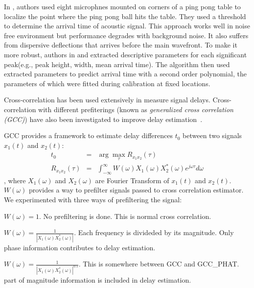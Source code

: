 In \cite{tdoa:ppp}, authors used eight microphnes mounted on corners of a ping pong table to localize the point where the ping pong ball hits the table. They used a threshold to determine the arrival time of acoustic signal. This approach works well in noise free environment but performance degrades with background noise. It also suffers from dispersive deflections that arrives before the main wavefront. To make it more robust, authors in \cite{tdoa:mit3} and \cite{tdoa:mit4} extracted descriptive parameters for each significant peak(e.g., peak height, width, mean arrival time). The algorithm then used extracted parameters to predict arrival time with a second order polynomial, the parameters of which were fitted during calibration at fixed locations.

Cross-correlation has been used extensively in measure signal delays\cite{tdoa:mit2, tdoa:3}. Cross-correlation with different prefiterings (known as \emph{generalized cross correlation (GCC)}) have also been investigated to improve delay estimation~\cite{tdoa:gcc1,tdoa:gcc2,tdoa:gcc3}.

GCC provides a framework to estimate delay differences $t_0$ between two signals $x_1(t)$ and $x_2(t)$:
\begin{eqnarray} \label{eq:gcc}
t_0 &=& \arg\max_{\tau} R_{x_1x_2}(\tau) \\
R_{x_1x_2}(\tau) &=& \int_{-\infty}^\infty W(\omega) X_1(\omega) X_2^{*}(\omega) e^{j\omega\tau} d\omega
\end{eqnarray}
, where $X_1(\omega)$ and $X_2(\omega)$ are Fourier Transform of $x_1(t)$ and $x_2(t)$. $W(\omega)$ provides a way to prefilter signals passed to cross correlation estimator. We experimented with three ways of prefiltering the signal:
\begin{description}
\item[GCC] $W(\omega) = 1$. No prefiltering is done. This is normal cross correlation.
\item[GCC\_PHAT] $W(\omega) = \frac{1}{\left|X_1(\omega)X_2^{*}(\omega)\right|}$. Each frequency is divideded by its magnitude. Only phase information contributes to delay estimation.
\item[GCC\_PHAT\_SQRT] $W(\omega) = \frac{1}{\left|X_1(\omega)X_2^*(\omega)\right|^{0.5}}$. This is somewhere between GCC and GCC\_PHAT. part of magnitude information is included in delay estimation.
\end{description}
